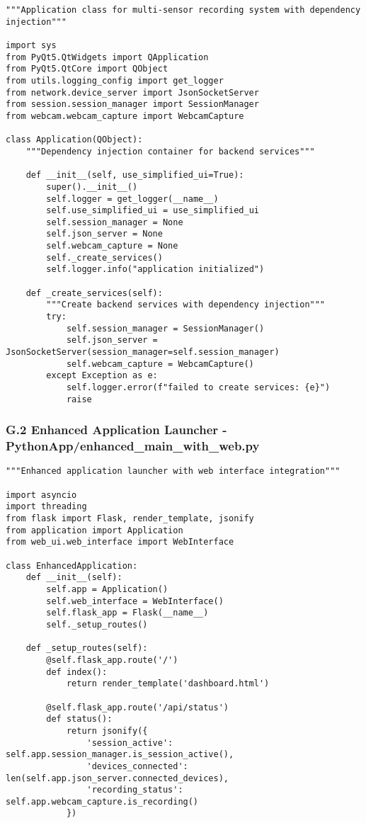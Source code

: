 \documentclass[11pt,a4paper]{article}
\begin{document}
\begin{verbatim}
"""Application class for multi-sensor recording system with dependency injection"""

import sys
from PyQt5.QtWidgets import QApplication
from PyQt5.QtCore import QObject
from utils.logging_config import get_logger
from network.device_server import JsonSocketServer
from session.session_manager import SessionManager
from webcam.webcam_capture import WebcamCapture

class Application(QObject):
    """Dependency injection container for backend services"""

    def __init__(self, use_simplified_ui=True):
        super().__init__()
        self.logger = get_logger(__name__)
        self.use_simplified_ui = use_simplified_ui
        self.session_manager = None
        self.json_server = None
        self.webcam_capture = None
        self._create_services()
        self.logger.info("application initialized")

    def _create_services(self):
        """Create backend services with dependency injection"""
        try:
            self.session_manager = SessionManager()
            self.json_server = JsonSocketServer(session_manager=self.session_manager)
            self.webcam_capture = WebcamCapture()
        except Exception as e:
            self.logger.error(f"failed to create services: {e}")
            raise
\end{verbatim}

\subsubsection{G.2 Enhanced Application Launcher - PythonApp/enhanced_main_with_web.py}

\begin{verbatim}
"""Enhanced application launcher with web interface integration"""

import asyncio
import threading
from flask import Flask, render_template, jsonify
from application import Application
from web_ui.web_interface import WebInterface

class EnhancedApplication:
    def __init__(self):
        self.app = Application()
        self.web_interface = WebInterface()
        self.flask_app = Flask(__name__)
        self._setup_routes()

    def _setup_routes(self):
        @self.flask_app.route('/')
        def index():
            return render_template('dashboard.html')

        @self.flask_app.route('/api/status')
        def status():
            return jsonify({
                'session_active': self.app.session_manager.is_session_active(),
                'devices_connected': len(self.app.json_server.connected_devices),
                'recording_status': self.app.webcam_capture.is_recording()
            })
\end{verbatim}
\end{document}

